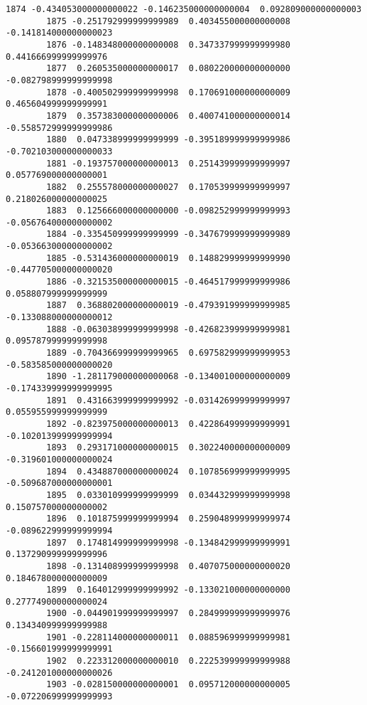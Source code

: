 \documentclass[11pt]{article}
\begin{document}
\begin{Verbatim}[commandchars=\\\{\}]
        1874 -0.434053000000000022 -0.146235000000000004  0.092809000000000003   
        1875 -0.251792999999999989  0.403455000000000008 -0.141814000000000023   
        1876 -0.148348000000000008  0.347337999999999980  0.441666999999999976   
        1877  0.260535000000000017  0.080220000000000000 -0.082798999999999998   
        1878 -0.400502999999999998  0.170691000000000009  0.465604999999999991   
        1879  0.357383000000000006  0.400741000000000014 -0.558572999999999986   
        1880  0.047338999999999999 -0.395189999999999986 -0.702103000000000033   
        1881 -0.193757000000000013  0.251439999999999997  0.057769000000000001   
        1882  0.255578000000000027  0.170539999999999997  0.218026000000000025   
        1883  0.125666000000000000 -0.098252999999999993 -0.056764000000000002   
        1884 -0.335450999999999999 -0.347679999999999989 -0.053663000000000002   
        1885 -0.531436000000000019  0.148829999999999990 -0.447705000000000020   
        1886 -0.321535000000000015 -0.464517999999999986  0.058807999999999999   
        1887  0.368802000000000019 -0.479391999999999985 -0.133088000000000012   
        1888 -0.063038999999999998 -0.426823999999999981  0.095787999999999998   
        1889 -0.704366999999999965  0.697582999999999953 -0.583585000000000020   
        1890 -1.281179000000000068 -0.134001000000000009 -0.174339999999999995   
        1891  0.431663999999999992 -0.031426999999999997  0.055955999999999999   
        1892 -0.823975000000000013  0.422864999999999991 -0.102013999999999994   
        1893  0.293171000000000015  0.302240000000000009 -0.319601000000000024   
        1894  0.434887000000000024  0.107856999999999995 -0.509687000000000001   
        1895  0.033010999999999999  0.034432999999999998  0.150757000000000002   
        1896  0.101875999999999994  0.259048999999999974 -0.089622999999999994   
        1897  0.174814999999999998 -0.134842999999999991  0.137290999999999996   
        1898 -0.131408999999999998  0.407075000000000020  0.184678000000000009   
        1899  0.164012999999999992 -0.133021000000000000  0.277749000000000024   
        1900 -0.044901999999999997  0.284999999999999976  0.134340999999999988   
        1901 -0.228114000000000011  0.088596999999999981 -0.156601999999999991   
        1902  0.223312000000000010  0.222539999999999988 -0.241201000000000026   
        1903 -0.028150000000000001  0.095712000000000005 -0.072206999999999993   
        

\end{Verbatim}
\end{document}

